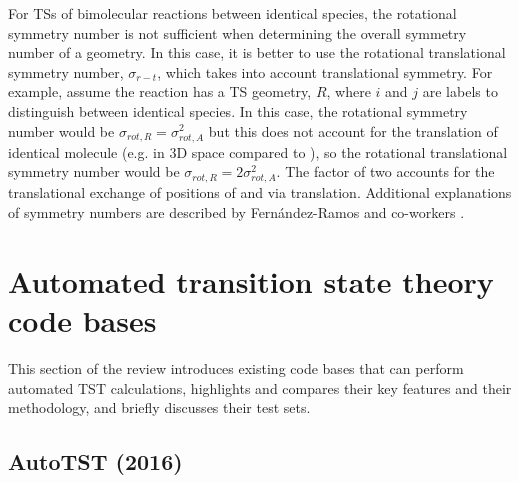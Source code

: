 \documentclass[preprint, 11pt]{elsarticle} %
\begin{document}
For TSs of bimolecular reactions between identical species, the rotational symmetry number is not sufficient when determining the overall symmetry number of a geometry.
In this case, it is better to use the rotational translational symmetry number, $\sigma_{r-t}$, which takes into account translational symmetry.
For example, assume the reaction  has a TS geometry, $R$, where $i$ and $j$ are labels to distinguish between identical  species.
In this case, the rotational symmetry number would be $\sigma_{rot,R} = \sigma_{rot,A}^2$ but this does not account for the translation of identical molecule (e.g.  in 3D space compared to ), so the rotational translational symmetry number would be $\sigma_{rot,R} = 2\sigma_{rot,A}^2$. 
The factor of two accounts for the translational exchange of positions of  and  via translation.
Additional explanations of symmetry numbers are described by Fernández-Ramos and co-workers \cite{FernandezRamos:2007}.




\section{Automated transition state theory code bases}

This section of the review introduces existing code bases that can perform automated TST calculations, highlights and compares their key features and their methodology, and briefly discusses their test sets.


\subsection{AutoTST (2016)}
\end{document}
